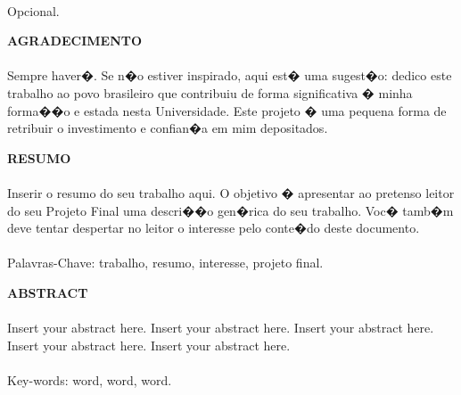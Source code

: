 \paragraph{}Opcional.

\pagebreak


\begin{center}
\textbf{AGRADECIMENTO}
\end{center}
      \vspace{0.5cm}

\paragraph{}Sempre haver�. Se n�o estiver inspirado, aqui est� uma sugest�o: dedico este trabalho ao povo brasileiro que contribuiu de forma significativa � minha forma��o e estada nesta Universidade. Este projeto � uma pequena forma de retribuir o investimento e confian�a em mim depositados.

\pagebreak


\begin{center}
\textbf{RESUMO}
\end{center}
      \vspace{0.5cm}

\paragraph{}Inserir o resumo do seu trabalho aqui. O objetivo � apresentar ao pretenso leitor do seu Projeto Final uma descri��o gen�rica do seu trabalho. Voc� tamb�m deve tentar despertar no leitor o interesse pelo conte�do deste documento.
\paragraph{}
\noindent Palavras-Chave: trabalho, resumo, interesse, projeto final.

\pagebreak


\begin{center}
\textbf{ABSTRACT}
\end{center}
      \vspace{0.5cm}

\paragraph{}Insert your abstract here. Insert your abstract here. Insert your abstract here. Insert your abstract here. Insert your abstract here.
\paragraph{}
\noindent Key-words: word, word, word.

